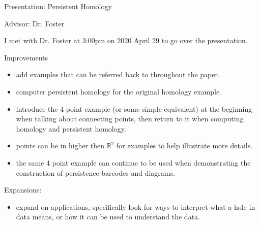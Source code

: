 \documentclass{exam}
\newcommand*{\R}{\ensuremath{\mathbb{R}}}
\begin{document}
Presentation: Persistent Homology

Advisor: Dr. Foster

\bigskip

I met with Dr. Foster at 3:00pm on 2020 April 29 to go over the presentation.

\bigskip

Improvements
\begin{itemize}
    \item add examples that can be referred back to throughout the paper.
    \item computer persistent homology for the original homology example.
    \item introduce the 4 point example (or some simple equivalent) at the beginning when talking about connecting points, then return to it when computing homology and persistent homology.
    \item points can be in higher then \(\R^2\) for examples to help illustrate more details.
    \item the same 4 point example can continue to be used when demonstrating the construction of persistence barcodes and diagrams.
\end{itemize}

Expansions:
\begin{itemize}
    \item expand on applications, specifically look for ways to interpret what a hole in data means, or how it can be used to understand the data.
\end{itemize}
\end{document}
